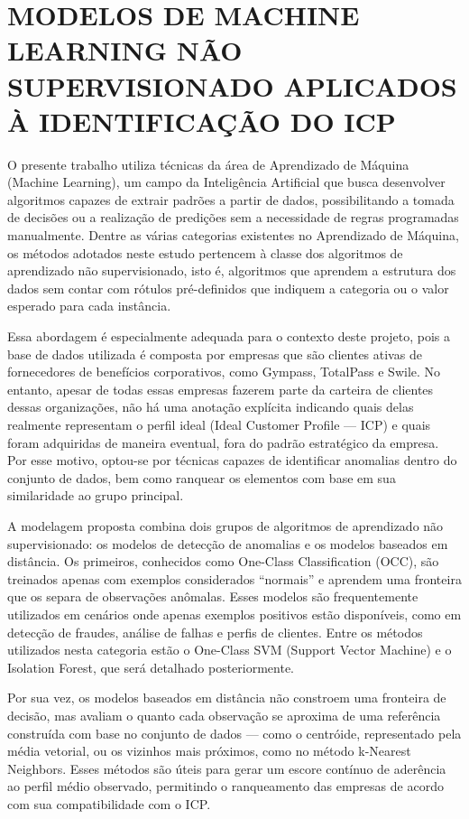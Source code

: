 \section{MODELOS DE MACHINE LEARNING NÃO SUPERVISIONADO APLICADOS À IDENTIFICAÇÃO DO ICP}

O presente trabalho utiliza técnicas da área de Aprendizado de Máquina (Machine Learning), um campo da Inteligência Artificial que busca desenvolver algoritmos capazes de extrair padrões a partir de dados, possibilitando a tomada de decisões ou a realização de predições sem a necessidade de regras programadas manualmente. Dentre as várias categorias existentes no Aprendizado de Máquina, os métodos adotados neste estudo pertencem à classe dos algoritmos de aprendizado não supervisionado, isto é, algoritmos que aprendem a estrutura dos dados sem contar com rótulos pré-definidos que indiquem a categoria ou o valor esperado para cada instância.

Essa abordagem é especialmente adequada para o contexto deste projeto, pois a base de dados utilizada é composta por empresas que são clientes ativas de fornecedores de benefícios corporativos, como Gympass, TotalPass e Swile. No entanto, apesar de todas essas empresas fazerem parte da carteira de clientes dessas organizações, não há uma anotação explícita indicando quais delas realmente representam o perfil ideal (Ideal Customer Profile — ICP) e quais foram adquiridas de maneira eventual, fora do padrão estratégico da empresa. Por esse motivo, optou-se por técnicas capazes de identificar anomalias dentro do conjunto de dados, bem como ranquear os elementos com base em sua similaridade ao grupo principal.

A modelagem proposta combina dois grupos de algoritmos de aprendizado não supervisionado: os modelos de detecção de anomalias e os modelos baseados em distância. Os primeiros, conhecidos como One-Class Classification (OCC), são treinados apenas com exemplos considerados “normais” e aprendem uma fronteira que os separa de observações anômalas. Esses modelos são frequentemente utilizados em cenários onde apenas exemplos positivos estão disponíveis, como em detecção de fraudes, análise de falhas e perfis de clientes. Entre os métodos utilizados nesta categoria estão o One-Class SVM (Support Vector Machine) e o Isolation Forest, que será detalhado posteriormente.

Por sua vez, os modelos baseados em distância não constroem uma fronteira de decisão, mas avaliam o quanto cada observação se aproxima de uma referência construída com base no conjunto de dados — como o centróide, representado pela média vetorial, ou os vizinhos mais próximos, como no método k-Nearest Neighbors. Esses métodos são úteis para gerar um escore contínuo de aderência ao perfil médio observado, permitindo o ranqueamento das empresas de acordo com sua compatibilidade com o ICP.

